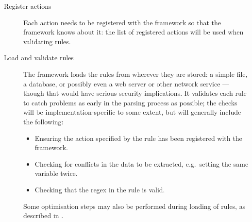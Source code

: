 \begin{description}

    \item [Register actions]  Each action needs to be registered with the
        framework so that the framework knows about it: the list of
        registered actions will be used when validating rules.

    \item [Load and validate rules]  The framework loads the rules from
        wherever they are stored: a simple file, a database, or possibly
        even a web server or other network service --- though that would
        have serious security implications.  It validates each rule to
        catch problems as early in the parsing process as possible; the
        checks will be implementation-specific to some extent, but will
        generally include the following:

        \begin{itemize}

            \squeezeitems{}

            \item Ensuring the action specified by the rule has been
                registered with the framework.

            \item Checking for conflicts in the data to be extracted, e.g.\
                setting the same variable twice.

            \item Checking that the regex in the rule is valid.

        \end{itemize}

        Some optimisation steps may also be performed during loading of
        rules, as described in \sectionref{parser efficiency}.


\end{description}
